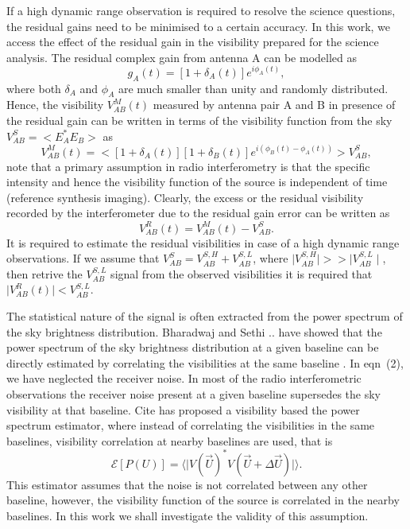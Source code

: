 \documentclass[fleqn,usenatbib]{mnras}
\begin{document}
If a high dynamic range observation is required to resolve the science questions, the residual gains need to be minimised to a certain accuracy. In this work, we access the effect of the residual gain in the visibility prepared for the science analysis. The residual complex gain from antenna A can be modelled as 
\begin{equation}
 g_A(t) = \left [ 1+\delta_A(t) \right ]e^{i\phi_A(t)},
\end{equation}
where both $\delta_A$ and $\phi_A$ are much smaller than unity and randomly distributed. 
Hence, the visibility $V_{AB}^M(t)$ measured by antenna pair A and B in presence of the residual gain can be written in terms of  the visibility function from the sky $V_{AB}^S = < E^*_A E_B>$  as
\begin{equation}
    V_{AB}^M(t) = < \left [ 1+\delta_A(t) \right ] \left [1+\delta_B(t)\right ] e^{i(\phi_B(t)-\phi_A(t))}> V_{AB}^S,
\end{equation}
note that a primary assumption in radio interferometry is that the specific intensity and hence the visibility function of the source is independent of time (reference synthesis imaging).  Clearly, the excess or the residual visibility recorded by the interferometer due to the residual gain error can be written as
\begin{equation}
    V_{AB}^R (t)= V_{AB}^M(t) - V_{AB}^S.
\end{equation}
It is required to estimate  the residual visibilities in case of a high dynamic range observations. If we assume that $
V_{AB}^S = V_{AB}^{S, H} + V_{AB}^{S, L} $, where $\mid V_{AB}^{S, H} \mid >> \mid V_{AB}^{S, L} \mid $, then retrive the $V_{AB}^{S, L} $ signal from the observed visibilities it is required that $\mid V_{AB}^R (t) \mid < V_{AB}^{S, L} $. 

The statistical nature of the signal is often extracted from the power spectrum of the sky brightness distribution. Bharadwaj and Sethi .. have showed that the power spectrum of the sky brightness distribution at a given baseline can be directly estimated by correlating the visibilities at the same baseline . In eqn~(2), we have neglected the receiver noise. In most of the radio interferometric observations the receiver noise present at a given baseline supersedes the sky visibility at that baseline. Cite has proposed a visibility based the power spectrum estimator, where instead of correlating the visibilities in the same baselines, visibility correlation at nearby baselines are used, that is 
\begin{equation}
    \mathcal{E} [P(U)]  = \langle \mid V(\vec{U})^* V(\vec{U}+\Delta \vec{U}) \mid \rangle.
\end{equation}
This estimator assumes that the noise  is not correlated between any other baseline, however, the visibility function of the source is correlated in the nearby baselines. In this work we shall investigate the validity of this assumption. 
\end{document}
